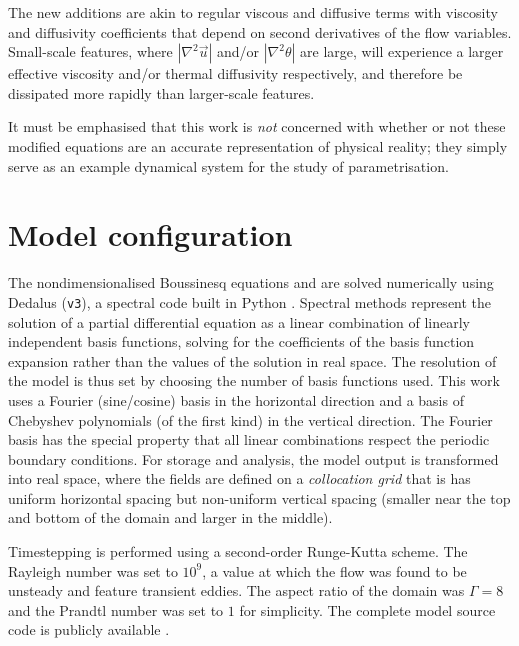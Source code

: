 \documentclass[../main.tex]{subfiles}
\begin{document}
The new additions are akin to regular viscous and diffusive terms with
viscosity and diffusivity coefficients that depend on second derivatives of the
flow variables. Small-scale features, where $|\nabla^2 \vec{u}|$ and/or
$|\nabla^2 \theta|$ are large, will experience a larger effective viscosity
and/or thermal diffusivity respectively, and therefore be dissipated more
rapidly than larger-scale features.

It must be emphasised that this work is \emph{not} concerned with whether or
not these modified equations are an accurate representation of physical
reality; they simply serve as an example dynamical system for the study of
parametrisation.


\section{Model configuration} \label{sec:config}
The nondimensionalised Boussinesq equations
 and
 are solved numerically using Dedalus
(\texttt{v3}), a spectral code built in Python \parencite{burns2020}. Spectral
methods represent the solution of a partial differential equation as a linear
combination of linearly independent basis functions, solving for the
coefficients of the basis function expansion rather than the values of the
solution in real space. The resolution of the model is thus set by choosing the
number of basis functions used. This work uses a Fourier (sine/cosine) basis in
the horizontal direction and a basis of Chebyshev polynomials (of the first
kind) in the vertical direction. The Fourier basis has the special property
that all linear combinations respect the periodic boundary conditions.
For storage and analysis, the model output is transformed into real space,
where the fields are defined on a \emph{collocation grid} that is has uniform
horizontal spacing but non-uniform vertical spacing (smaller near the top and
bottom of the domain and larger in the middle).

Timestepping is performed using a second-order Runge-Kutta scheme. The Rayleigh
number was set to $10^9$, a value at which the flow was found to be unsteady
and feature transient eddies. The aspect ratio of the domain was $\Gamma = 8$
and the Prandtl number was set to $1$ for simplicity. The complete model source
code is publicly available .

\end{document}
